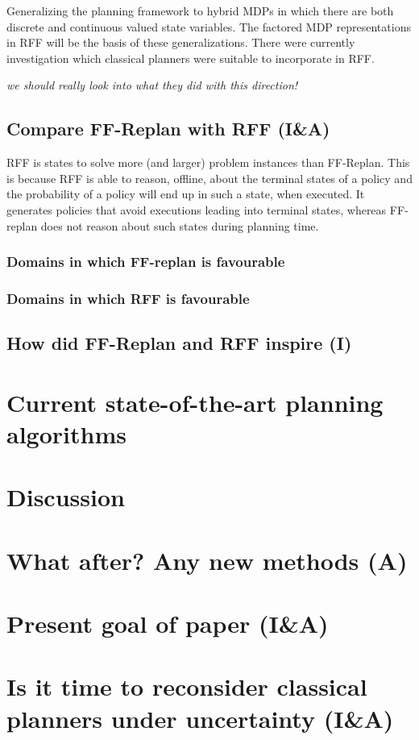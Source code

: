 \documentclass[runningheads,a4paper]{llncs}
\begin{document}
Generalizing the planning framework to hybrid MDPs in which there are both discrete and continuous valued state variables. The factored MDP representations in RFF will be the basis of these generalizations. There were currently investigation which classical planners were suitable to incorporate in RFF.

\emph{we should really look into what they did with this direction!}

\subsection{Compare FF-Replan with RFF (I\&A)}
RFF is states to solve more (and larger) problem instances than FF-Replan. This is because RFF is able to reason, offline, about the terminal states of a policy and the probability of a policy will end up in such a state, when executed. It generates policies that avoid executions leading into terminal states, whereas FF-replan does not reason about such states during planning time.

\subsubsection{Domains in which FF-replan is favourable}

\subsubsection{Domains in which RFF is favourable}


\subsection{How did FF-Replan and RFF inspire (I)}

\section{Current state-of-the-art planning algorithms}

\section{Discussion}

\section{What after? Any new methods (A)}

\section{Present goal of paper (I\&A)}

\section{Is it time to reconsider classical planners under uncertainty (I\&A)}



\end{document}
